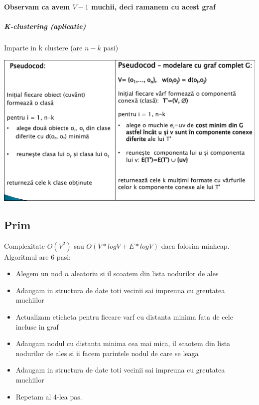\documentclass{article}
\begin{document}
\begin{center}
    \textbf{Observam ca avem $V-1$ muchii, deci ramanem cu acest graf}
\end{center}

\subparagraph*{K-clustering (aplicatie)} Imparte in k clustere (are $n-k$ pasi)
\begin{center}
    \includegraphics[scale=0.3]{1_kclustering.png}
\end{center}

\subsection*{Prim} Complexitate $O(V^2)$ sau $O(V*logV + E*logV)$ daca folosim minheap. Algoritmul are 6 pasi:
\begin{itemize}
    \item Alegem un nod $n$ aleatoriu si il scoatem din lista nodurilor de ales
    \item Adaugam in structura de date toti vecinii sai impreuna cu greutatea muchiilor
    \item Actualizam eticheta pentru fiecare varf cu distanta minima fata de cele incluse in graf
    \item Adaugam nodul cu distanta minima cea mai mica, il scaotem din lista nodurilor de ales si ii facem parintele nodul de care se leaga
    \item Adaugam in structura de date toti vecinii sai impreuna cu greutatea muchiilor
    \item Repetam al 4-lea pas.
\end{itemize}
\end{document}
